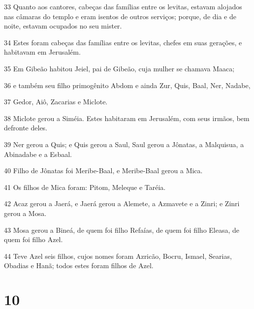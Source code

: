 \par 33 Quanto aos cantores, cabeças das famílias entre os levitas, estavam alojados nas câmaras do templo e eram isentos de outros serviços; porque, de dia e de noite, estavam ocupados no seu mister.
\par 34 Estes foram cabeças das famílias entre os levitas, chefes em suas gerações, e habitavam em Jerusalém.
\par 35 Em Gibeão habitou Jeiel, pai de Gibeão, cuja mulher se chamava Maaca;
\par 36 e também seu filho primogênito Abdom e ainda Zur, Quis, Baal, Ner, Nadabe,
\par 37 Gedor, Aiô, Zacarias e Miclote.
\par 38 Miclote gerou a Siméia. Estes habitaram em Jerusalém, com seus irmãos, bem defronte deles.
\par 39 Ner gerou a Quis; e Quis gerou a Saul, Saul gerou a Jônatas, a Malquisua, a Abinadabe e a Esbaal.
\par 40 Filho de Jônatas foi Meribe-Baal, e Meribe-Baal gerou a Mica.
\par 41 Os filhos de Mica foram: Pitom, Meleque e Taréia.
\par 42 Acaz gerou a Jaerá, e Jaerá gerou a Alemete, a Azmavete e a Zinri; e Zinri gerou a Mosa.
\par 43 Mosa gerou a Bineá, de quem foi filho Refaías, de quem foi filho Eleasa, de quem foi filho Azel.
\par 44 Teve Azel seis filhos, cujos nomes foram Azricão, Bocru, Ismael, Searias, Obadias e Hanã; todos estes foram filhos de Azel.

\chapter{10}

